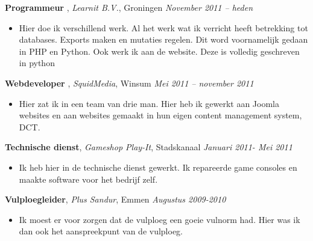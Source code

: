 \documentclass[9pt]{article}
\newenvironment{changemargin}[2]{%
  \begin{list}{}{%
    \setlength{\topsep}{0pt}%
    \setlength{\leftmargin}{#1}%
    \setlength{\rightmargin}{#2}%
    \setlength{\listparindent}{\parindent}%
    \setlength{\itemindent}{\parindent}%
    \setlength{\parsep}{\parskip}%
  }%
  \item[]}{\end{list}
}
\newenvironment{body} {
	\vspace*{-16pt}
	\begin{changemargin}{-0.25in}{-0.5in}
  }	
	{\end{changemargin}
}
\begin{document}
\begin{body}
	\vspace{14pt}
	\textbf{Programmeur }, \emph{Learnit B.V.}, Groningen \hfill \emph{November 2011 -- heden}\\
	\vspace*{-4pt}
	\begin{itemize} \itemsep -0pt  %
		\item Hier doe ik verschillend werk. Al het werk wat ik verricht heeft betrekking tot databases. Exports maken en mutaties regelen. Dit word voornamelijk gedaan in PHP en Python. Ook werk ik aan de website. Deze is volledig geschreven in python 
	\end{itemize}

	\textbf {Webdeveloper }, \emph{SquidMedia}, Winsum  \hfill \emph{Mei 2011 -- november 2011 }\\
	\vspace*{-4pt}
	\begin{itemize} \itemsep -0pt
		\item Hier zat ik in een team van drie man. Hier heb ik gewerkt aan Joomla websites en aan websites gemaakt in hun eigen content management system, DCT.
	\end{itemize}

	\textbf {Technische dienst}, \emph{Gameshop Play-It}, Stadskanaal   \hfill \emph{Januari 2011- Mei 2011  }\\
	\vspace*{-4pt}
	\begin{itemize} \itemsep -0pt
		\item Ik heb hier in de technische dienst gewerkt. Ik repareerde game consoles en maakte software voor het bedrijf zelf.
	\end{itemize}

	\textbf {Vulploegleider}, \emph{Plus Sandur}, Emmen  \hfill \emph{Augustus 2009-2010}\\
	\vspace*{-4pt}
	\begin{itemize} \itemsep -0pt
		\item Ik moest er voor zorgen dat de vulploeg een goeie vulnorm had. Hier was ik dan ook het aanspreekpunt van de vulploeg.
	\end{itemize}
\end{body}

\smallskip

\newpage{} %
\end{document}
